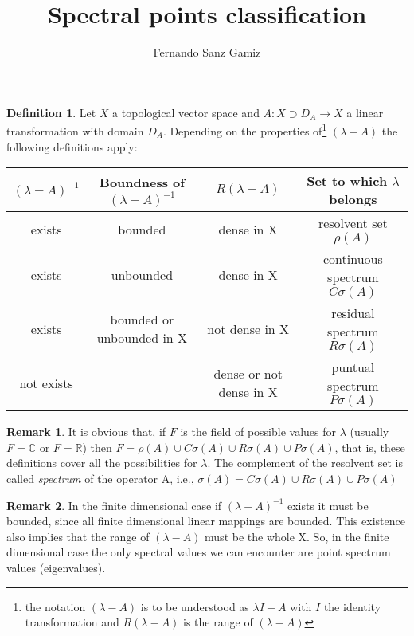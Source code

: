 \documentclass[12pt]{article}
\theoremstyle{definition}
\newtheorem{defn}{Definition}
\newtheorem{rem}{Remark}
\numberwithin{equation}{section}
\begin{document}
\title{Spectral points classification}%
\author{Fernando Sanz Gamiz}%

\begin{defn}
Let $X$ a topological vector space and $A: X \supset D_A \longrightarrow X$ a linear transformation with
domain $D_A$. Depending on the properties of\footnote{the notation $(\lambda -A)$ is to be
understood as $\lambda I -A$ with $I$ the identity transformation and $R(\lambda-A)$ is the range
of $(\lambda -A)$} $(\lambda - A)$ the following definitions apply:

\medskip

\begin{center}
\begin{tabular}{cccc}
$(\lambda-A)^{-1}$ & Boundness of $(\lambda-A)^{-1}$ & $R(\lambda-A)$ & Set to which $\lambda$ belongs\\
\hline \hline
exists & bounded & dense in X& resolvent set $\rho(A)$\\
\hline
exists & unbounded & dense in X & continuous spectrum $C\sigma(A)$\\
\hline
exists & bounded or unbounded in X & not dense in X & residual spectrum $R\sigma(A)$\\
\hline
not exists &  & dense or not dense in X & puntual spectrum $P\sigma(A)$\\
\end{tabular}
\end{center}
\end{defn}

\begin{rem}
It is obvious that, if $F$ is the field of possible values for $\lambda$ (usually $F=\mathbb C$ or
$F=\mathbb R$) then $F=\rho(A) \cup C\sigma(A) \cup R\sigma(A) \cup P\sigma(A)$, that is, these
definitions cover all the possibilities for $\lambda$. The complement of the resolvent set is called \emph{spectrum} of the operator A, i.e., $\sigma(A)=C\sigma(A) \cup R\sigma(A) \cup P\sigma(A)$
\end{rem}

\bigskip

\begin{rem}
In the finite dimensional case if $(\lambda-A)^{-1}$ exists it must be bounded, since all finite
dimensional linear mappings are bounded. This existence also implies that the range of
$(\lambda-A)$ must be the whole X. So, in the finite dimensional case the only spectral values we
can encounter are point spectrum values (eigenvalues).
\end{rem}

\end{document}
